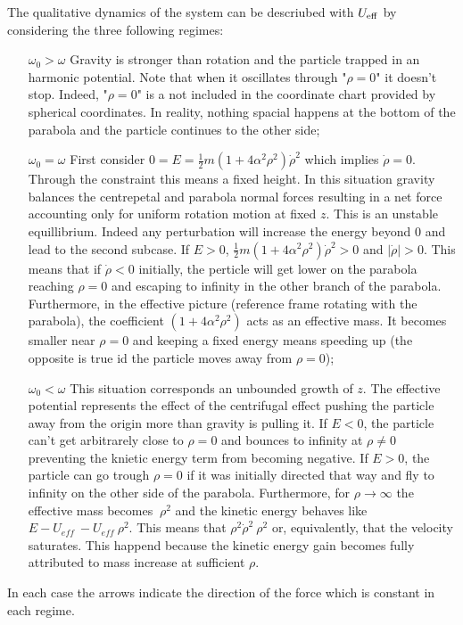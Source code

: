 \documentclass[10pt, a4paper]{article}
\begin{document}
The qualitative dynamics of the system can be descriubed with $U_{\rm eff}$ by considering the three following regimes:\\[0.5cm]
\begin{minipage}{0.5\textwidth}
    \begin{enumerate}
        \item[$\omega_0 > \omega$] Gravity is stronger than rotation and the particle trapped in an harmonic potential. Note that when it oscillates through "$\rho=0$" it doesn't stop. Indeed, "$\rho=0$" is a not included in the coordinate chart provided by spherical coordinates. In reality, nothing spacial happens at the bottom of the parabola and the particle continues to the other side;
        \item[$\omega_0 = \omega$] First consider $0=E=\frac{1}{2}m\left(1 + 4\alpha^2 \rho^2\right) \dot{\rho}^2$ which implies $\dot{\rho}=0$. Through the constraint this means a fixed height. In this situation gravity balances the centrepetal and parabola normal forces resulting in a net force accounting only for uniform rotation motion at fixed $z$. This is an unstable equillibrium. Indeed any perturbation will increase the energy beyond $0$ and lead to the second subcase. If $E> 0$, $\frac{1}{2}m\left(1 + 4\alpha^2 \rho^2\right) \dot{\rho}^2 > 0$ and $|\dot{\rho}| > 0$. This means that if $\dot{\rho} < 0$ initially, the perticle will get lower on the parabola reaching $\rho=0$ and escaping to infinity in the other branch of the parabola. Furthermore, in the effective picture (reference frame rotating with the parabola), the coefficient $\left(1 + 4\alpha^2 \rho^2\right)$ acts as an effective mass. It becomes smaller near $\rho = 0$ and keeping a fixed energy means speeding up (the opposite is true id the particle moves away from $\rho =0$);
        \item[$\omega_0 < \omega$] This situation corresponds an unbounded growth of $z$. The effective potential represents the effect of the centrifugal effect pushing the particle away from the origin more than gravity is pulling it. If $E<0$, the particle can't get arbitrarely close to $\rho = 0$ and bounces to infinity at $\rho \neq 0$ preventing the knietic energy term from becoming negative. If $E>0$, the particle can go trough $\rho = 0$ if it was initially directed that way and fly to infinity on the other side of the parabola. Furthermore, for $\rho \to \infty$ the effective mass becomes $~\rho^2$ and the kinetic energy behaves like $E-U_{eff}~-U_{eff}~\rho^2$. This means that $\rho^2 \dot{\rho}^2 ~ \rho^2$ or, equivalently, that the velocity saturates. This happend because the kinetic energy gain becomes fully attributed to mass increase at sufficient $\rho$.
    \end{enumerate}
    In each case the arrows indicate the direction of the force which is constant in each regime. 
\end{minipage}
\end{document}

